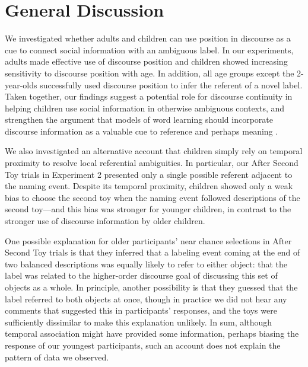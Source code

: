 \documentclass[man]{apa2}
\begin{document}
\section{General Discussion} 

We investigated whether adults and children can use position in discourse as a cue to connect social information with an ambiguous label. In our experiments, adults made effective use of discourse position and children showed increasing sensitivity to discourse position with age. In addition, all age groups except the 2-year-olds successfully used discourse position to infer the referent of a novel label. Taken together, our findings suggest a potential role for discourse continuity in helping children use social information in otherwise ambiguous contexts, and strengthen the argument that models of word learning should incorporate discourse information as a valuable cue to reference and perhaps meaning \cite{luong2013}.

We also investigated an alternative account that children simply rely on temporal proximity to resolve local referential ambiguities.  In particular, our After Second Toy trials in Experiment 2 presented only a single possible referent adjacent to the naming event.  Despite its temporal proximity, children showed only a weak bias to choose the second toy when the naming event followed descriptions of the second toy---and this bias was stronger for younger children, in contrast to the stronger use of discourse information by older children.

One possible explanation for older participants' near chance selections in After Second Toy trials is that they inferred that a labeling event coming at the end of two balanced descriptions was equally likely to refer to either object: that the label was related to the higher-order discourse goal of discussing this set of objects as a whole. In principle, another possibility is that they guessed that the label referred to both objects at once, though in practice we did not hear any comments that suggested this in participants' responses, and the toys were sufficiently dissimilar to make this explanation unlikely. In sum, although temporal association might have provided some information, perhaps biasing the response of our youngest participants, such an account does not explain the pattern of data we observed.
\end{document}
